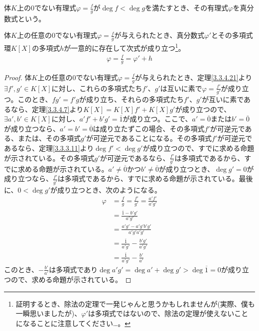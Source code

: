 \documentclass[dvipdfmx]{jsarticle}
\begin{document}
\begin{dfn}
体$K$上の$0$でない有理式$\varphi = \frac{f}{g}$が$\deg f < \deg g$を満たすとき、その有理式$\varphi$を真分数式という。
\end{dfn}
\begin{thm}\label{3.3.4.22}
体$K$上の任意の$0$でない有理式$\varphi = \frac{f}{g}$が与えられたとき、真分数式$\varphi'$とその多項式環$K[ X]$の多項式$h$が一意的に存在して次式が成り立つ\footnote{証明するとき、除法の定理で一発じゃんと思うかもしれませんが(実際、僕も一瞬思いましたが)、$\varphi'$は多項式ではないので、除法の定理が使えないことになることに注意してください…。}。
\begin{align*}
\varphi = \frac{f}{g} = \varphi' + h
\end{align*}
\end{thm}
\begin{proof}
体$K$上の任意の$0$でない有理式$\varphi = \frac{f}{g}$が与えられたとき、定理\ref{3.3.4.21}より$\exists f',g' \in K[ X]$に対し、これらの多項式たち$f'$、$g'$は互いに素で$\varphi = \frac{f'}{g'}$が成り立つ。このとき、$fg' = f'g$が成り立ち、それらの多項式たち$f'$、$g'$が互いに素であるなら、定理\ref{3.3.4.7}より$K[ X] = K[ X] f' + K[ X] g'$が成り立つので、$\exists a',b' \in K[ X]$に対し、$a'f' + b'g' = \overline{1}$が成り立つ。ここで、$a' = \overline{0}$または$b' = \overline{0}$が成り立つなら、$a' = b' = \overline{0}$は成り立たずこの場合、その多項式$f'$が可逆元である、または、その多項式$g'$が可逆元であることになる。その多項式$f'$が可逆元であるなら、定理\ref{3.3.3.11}より$\deg f' < \deg g'$が成り立つので、すでに求める命題が示されている。その多項式$g'$が可逆元であるなら、$\frac{f'}{g'}$は多項式であるから、すでに求める命題が示されている。$a' \neq \overline{0}$かつ$b' \neq \overline{0}$が成り立つとき、$\deg g' = 0$が成り立つなら、$\frac{f'}{g'}$は多項式であるから、すでに求める命題が示されている。最後に、$0 < \deg g'$が成り立つとき、次のようになる。
\begin{align*}
\varphi &= \frac{f}{g} = \frac{f'}{g'} = \frac{a'f'}{a'g'}\\
&= \frac{\overline{1} - b'g'}{a'g'}\\
&= \frac{a'g' - a'g'b'g'}{a'g'a'g'}\\
&= \frac{\overline{1}}{a'g'} - \frac{b'g'}{a'g'}\\
&= \frac{\overline{1}}{a'g'} - \frac{b'}{a'}
\end{align*}
このとき、$- \frac{b'}{a'}$は多項式であり$\deg{a'g'} = \deg a' + \deg g' > \deg\overline{1} = 0$が成り立つので、求める命題が示されている。\par

\end{proof}
\end{document}
